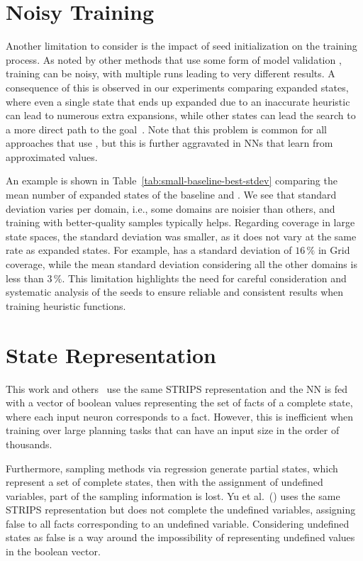 \section{Noisy Training}

Another limitation to consider is the impact of seed initialization on the training process. As noted by other methods that use some form of model validation \cite{Ferber.etal/2020a, Shen.etal/2020, Ferber.etal/2022, OToole/2022}, training can be noisy, with multiple runs leading to very different results. A consequence of this is observed in our experiments comparing expanded states, where even a single state that ends up expanded due to an inaccurate heuristic can lead to numerous extra expansions, while other states can lead the search to a more direct path to the goal~\cite{Heusner.etal/2017}. Note that this problem is common for all approaches that use \gbfs, but this is further aggravated in NNs that learn from approximated values.



An example is shown in Table~\ref{tab:small-baseline-best-stdev} comparing the mean number of expanded states of the baseline and \hnnrs. We see that standard deviation varies per domain, i.e., some domains are noisier than others, and training with better-quality samples typically helps. Regarding coverage in large state spaces, the standard deviation was smaller, as it does not vary at the same rate as expanded states. For example, \hnnrs has a standard deviation of $16\,\%$ in Grid coverage, while the mean standard deviation considering all the other domains is less than $3\,\%$. This limitation highlights the need for careful consideration and systematic analysis of the seeds to ensure reliable and consistent results when training heuristic functions.

\section{State Representation}

This work and others~\cite{Ferber.etal/2020a, Ferber.etal/2022, OToole/2022} use the same STRIPS representation and the NN is fed with a vector of boolean values representing the set of facts of a complete state, where each input neuron corresponds to a fact. However, this is inefficient when training over large planning tasks that can have an input size in the order of thousands.

Furthermore, sampling methods via regression generate partial states, which represent a set of complete states, then with the assignment of undefined variables, part of the sampling information is lost. Yu et al.~(\citeyear{Yu.etal/2020}) uses the same STRIPS representation but does not complete the undefined variables, assigning false to all facts corresponding to an undefined variable. Considering undefined states as false is a way around the impossibility of representing undefined values in the boolean vector.

